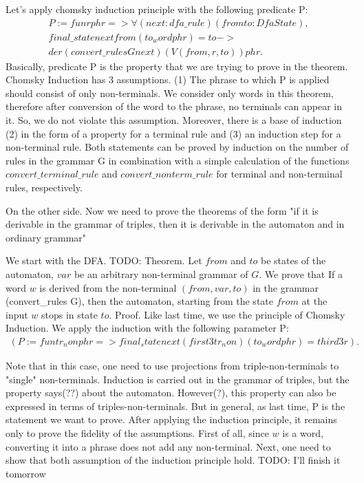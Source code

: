 Let's apply chomsky induction principle with the following predicate P:
\begin{align*}
  P := fun r phr => \forall (next : dfa\_rule) (from to : DfaState), \\
           final\_state next from (to_word phr) = to -> \\
            der (convert\_rules G next) (V (from, r, to)) phr.
\end{align*}
Basically, predicate P is the property that we are trying to prove in the theorem. Chomsky Induction has 3 assumptions.
(1) The phrase to which P is applied should consist of only non-terminals. We consider only words in this theorem, therefore after conversion of the word to the phrase, no terminals can appear in it. So, we do not violate this assumption.
Moreover, there is a base of induction (2) in the form of a property for a terminal rule and (3) an induction step for a non-terminal rule.
Both statements can be proved by induction on the number of rules in the grammar G in combination with a simple calculation of the functions $convert\_terminal\_rule$ and $convert\_nonterm\_rule$ for terminal and non-terminal rules, respectively.

On the other side. Now we need to prove the theorems of the form "if it is derivable in the grammar of triples, then it is derivable in the automaton and in ordinary grammar"

We start with the DFA.
TODO: Theorem.
Let $from$ and $to$ be states of the automaton, $var$ be an arbitrary non-terminal grammar of $G$. We prove that If a word $w$ is derived from the non-terminal $(from, var, to)$ in the grammar (convert\_rules G), then
the automaton, starting from the state $from$ at the input $w$ stops in state $to$.
Proof. 
Like last time, we use the principle of Chomsky Induction.
We apply the induction with the following parameter P:
\begin{align*}
(P := fun tr_non phr => final_state next (first3 tr_non) (to_word phr) = third3 r). 
\end{align*}

Note that in this case, one need to use projections from triple-non-terminals to "single" non-terminals. Induction is carried out in the grammar of triples, but the property says(??) about the automaton. However(?), this property can also be expressed in terms of triples-non-terminals.
But in general, as last time, P is the statement we want to prove.
After applying the induction principle, it remains only to prove the fidelity of the assumptions.
First of all, since $ w $ is a word, converting it into a phrase does not add any non-terminal.
Next, one need to show that both assumption of the induction principle hold.  TODO: I’ll finish it tomorrow

